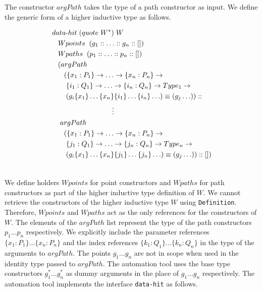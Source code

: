 \documentclass[sigplan,10pt]{acmart}
\begin{document}
The constructor $argPath$ takes the type of a path constructor as input. We define the generic form of a higher inductive type as follows.
\begin{center}
\begingroup
\fontsize{7.9pt}{0pt}\selectfont
\begin{align}
& data{\text -}hit \hspace {0.1cm} (quote \hspace {0.1cm} W^*) \hspace {0.1cm} W \nonumber \\
  & \hspace {0.3cm} Wpoints \hspace {0.2cm} (g_1 ::  \ldots :: g_n :: []) \nonumber \\
  & \hspace {0.3cm} Wpaths  \hspace {0.2cm} (p_1 :: \ldots :: p_n :: []) \nonumber \\
  & \hspace {0.3cm} (argPath \nonumber \\ 
  & \hspace {0.6cm} (\{x_1:P_1\} \rightarrow \ldots \rightarrow \{x_n:P_n\} \rightarrow \nonumber \\ 
  & \hspace {0.7cm} \{i_1:Q_1\} \rightarrow \ldots \rightarrow \{i_n:Q_n\} \rightarrow Type_1 \rightarrow \nonumber \\ 
  & \hspace {0.7cm} (g_i \{x_1\} \ldots \{x_n\} \{i_1\} \ldots \{i_n\} \ldots) \equiv (g_j \ldots)) :: \nonumber \\
  & \hspace {3cm} \vdots \nonumber \\
  & \hspace {0.4cm} argPath \nonumber \\ 
  & \hspace {0.6cm} (\{x_1:P_1\} \rightarrow \ldots \rightarrow \{x_n:P_n\} \rightarrow \nonumber \\ 
  & \hspace {0.7cm} \{j_1:Q_1\} \rightarrow \ldots \rightarrow \{j_n:Q_n\} \rightarrow Type_n \rightarrow \nonumber \\ 
  & \hspace {0.7cm} (g_i \{x_1\} \ldots \{x_n\} \{j_1\} \ldots \{j_n\} \ldots) \equiv (g_j \ldots)) :: [])\nonumber \\ \nonumber
\end{align}
\endgroup
\end{center}
\normalsize

We define holders $Wpoints$ for point constructors and $Wpaths$ for path constructors as part of the higher inductive type definition of $W$. We cannot retrieve the constructors of the higher inductive type $W$ using {\tt Definition}. Therefore, $Wpoints$ and $Wpaths$ act as the only references for the constructors of $W$. The elements of the $argPath$ list represent the type of the path constructors $p_1 \ldots p_n$ respectively. We explicitly include the parameter references $\{x_1 : P_1\} \ldots \{x_n : P_n\}$ and the index references $\{k_1 : Q_1\} \ldots \{k_n : Q_n\}$ in the type of the arguments to $argPath$. The points $g_1 \ldots g_n$ are not in scope when used in the identity type passed to $argPath$. The automation tool uses the base type constructors $g_1^* \ldots g_n^*$ as dummy arguments in the place of $g_1 \ldots g_n$ respectively. The automation tool implements the interface {\tt data-hit} as follows.
\end{document}
